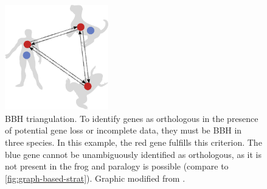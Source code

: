 \begin{figure}[t]
	\centering
	\includegraphics[width=0.4\textwidth]{img/triangulation-bbh.pdf}
	\caption[Bidirectional best hit (BBH) triangulation]{
		BBH triangulation. To identify genes as orthologous in the presence of
		potential gene loss or incomplete data, they must be BBH in three species.
		In this example, the red gene fulfills this criterion. The blue gene cannot
		be unambiguously identified as orthologous, as it is not present in the frog
		and paralogy is possible (compare to \autoref{fig:graph-based-strat}).
		Graphic modified from \citet{altenhoff2012}.
	}
	\label{fig:triangulation-bbh}
\end{figure}
